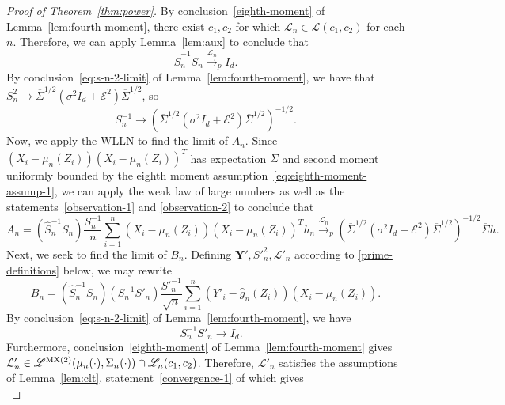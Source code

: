 \documentclass[12pt]{article}
\theoremstyle{definition}
\theoremstyle{remark}
\newcommand{\srx}{X}
\newcommand{\srz}{Z}
\newcommand{\pry}{{\bm Y}}
\begin{document}
\begin{proof}[Proof of Theorem~\ref{thm:power}]
	By conclusion~\eqref{eighth-moment} of Lemma~\ref{lem:fourth-moment}, there exist $c_1, c_2$ for which $\mathcal L_n \in \mathscr L(c_1, c_2)$ for each $n$. Therefore, we can apply Lemma~\ref{lem:aux} to conclude that 
	\begin{equation}
		\widehat S_n^{-1}S_n  \overset{\mathcal L_n}\rightarrow_p I_d. 
		\label{observation-1}
	\end{equation}
	By conclusion~\eqref{eq:s-n-2-limit} of Lemma~\ref{lem:fourth-moment}, we have that $S_n^2 \rightarrow \overline \Sigma^{1/2}(\sigma^2 I_d + \mathcal E^2)\overline \Sigma^{1/2}$, so 
	\begin{equation}
		S_n^{-1} \rightarrow (\overline \Sigma^{1/2}(\sigma^2 I_d + \mathcal E^2)\overline \Sigma^{1/2})^{-1/2}.
		\label{observation-2}
	\end{equation} 
	Now, we apply the WLLN to find the limit of $A_n$. Since $(\srx_i - \mu_n(\srz_i))(X_i - \mu_n(Z_i))^T$ has expectation $\overline \Sigma$ and second moment uniformly bounded by the eighth moment assumption~\eqref{eq:eighth-moment-assump-1}, we can apply the weak law of large numbers as well as the statements~\eqref{observation-1} and \eqref{observation-2} to conclude that
	\begin{equation*}
		A_n = (\widehat S^{-1}_nS_n)\frac{S_n^{-1}}{n}\sum_{i = 1}^n (\srx_i - \mu_n(\srz_i))(X_i - \mu_n(Z_i))^T h_n \overset{\mathcal L_n}\rightarrow_p (\overline \Sigma^{1/2}(\sigma^2 I_d + \mathcal E^2)\overline \Sigma^{1/2})^{-1/2}\overline \Sigma h.
	\end{equation*}
	Next, we seek to find the limit of $B_n$. Defining $\pry', S'^2_n, \mathcal L'_n$ according to \eqref{prime-definitions} below, we may rewrite
	\begin{equation}
		B_n = (\widehat S_n^{-1}S_n)(S_n^{-1}S'_n)\frac{S'^{-1}_n}{\sqrt{n}}\sum_{i = 1}^n (Y'_i - \widehat g_n(Z_i))(\srx_i - \mu_n(\srz_i)).
	\end{equation}
	By conclusion~\eqref{eq:s-n-2-limit} of Lemma~\ref{lem:fourth-moment}, we have
	\begin{equation}
		\quad S_n^{-1}S'_n \rightarrow I_d.
		\label{display-1}
	\end{equation}
	Furthermore, conclusion~\eqref{eighth-moment} of Lemma~\ref{lem:fourth-moment} gives $\mathcal L'_n \in \mathscr L^{\textnormal{MX(2)}}(\mu_n(\cdot), \Sigma_n(\cdot)) \cap \mathscr L_n(c_1, c_2)$. Therefore, $\mathcal L'_n$ satisfies the assumptions of Lemma~\ref{lem:clt}, statement~\eqref{convergence-1} of which gives
	\begin{equation}

\end{equation}
\end{proof}
\end{document}
